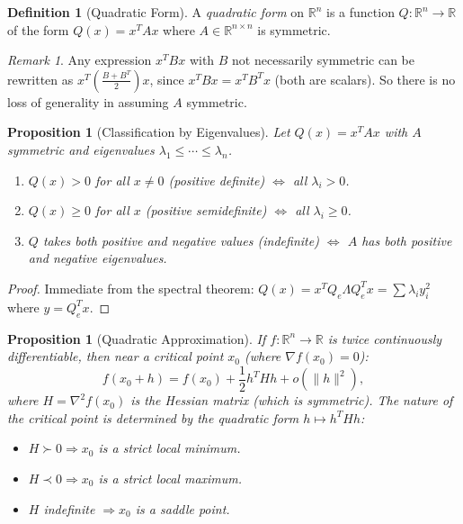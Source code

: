 \documentclass[11pt,a4paper]{article}
\theoremstyle{definition}
\newtheorem{definition}{Definition}[section]
\theoremstyle{plain}
\newtheorem{proposition}[theorem]{Proposition}
\theoremstyle{remark}
\newtheorem{remark}{Remark}[section]
\newcommand{\R}{\mathbb{R}}
\begin{document}
\begin{definition}[Quadratic Form]
\label{def:quadratic_form}
A \emph{quadratic form} on $\R^n$ is a function $Q: \R^n \to \R$ of the form
$Q(x) = x^T A x$ where $A \in \R^{n \times n}$ is symmetric.
\end{definition}

\begin{remark}
Any expression $x^T B x$ with $B$ not necessarily symmetric can be rewritten as
$x^T \left(\frac{B + B^T}{2}\right) x$, since $x^T B x = x^T B^T x$ (both are scalars).
So there is no loss of generality in assuming $A$ symmetric.
\end{remark}

\begin{proposition}[Classification by Eigenvalues]
\label{prop:quadratic_classification}
Let $Q(x) = x^T A x$ with $A$ symmetric and eigenvalues $\lambda_1 \leq \cdots \leq \lambda_n$.
\begin{enumerate}[nosep,label=(\roman*)]
    \item $Q(x) > 0$ for all $x \neq 0$ (positive definite) $\iff$ all $\lambda_i > 0$.
    \item $Q(x) \geq 0$ for all $x$ (positive semidefinite) $\iff$ all $\lambda_i \geq 0$.
    \item $Q$ takes both positive and negative values (indefinite) $\iff$ $A$ has both
          positive and negative eigenvalues.
\end{enumerate}
\end{proposition}

\begin{proof}
Immediate from the spectral theorem: $Q(x) = x^T Q_e \Lambda Q_e^T x = \sum \lambda_i y_i^2$
where $y = Q_e^T x$.
\end{proof}

\begin{proposition}[Quadratic Approximation]
\label{prop:quadratic_approx}
If $f: \R^n \to \R$ is twice continuously differentiable, then near a critical point $x_0$
(where $\nabla f(x_0) = 0$):
\[
    f(x_0 + h) = f(x_0) + \frac{1}{2} h^T H h + o(\|h\|^2),
\]
where $H = \nabla^2 f(x_0)$ is the Hessian matrix (which is symmetric). The nature of
the critical point is determined by the quadratic form $h \mapsto h^T H h$:
\begin{itemize}[nosep]
    \item $H \succ 0 \Rightarrow x_0$ is a strict local minimum.
    \item $H \prec 0 \Rightarrow x_0$ is a strict local maximum.
    \item $H$ indefinite $\Rightarrow x_0$ is a saddle point.
\end{itemize}
\end{proposition}
\end{document}
